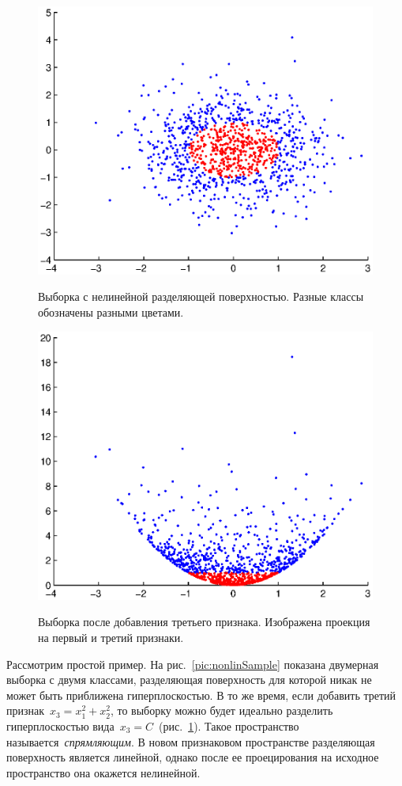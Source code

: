 \documentclass[12pt,fleqn]{article}
\begin{document}
\begin{figure}[t]
\centering
\begin{multicols}{2}
    \hfill
    \includegraphics[width=0.9\linewidth]{pics/example.eps}
    \hfill
    \caption{Выборка с нелинейной разделяющей поверхностью.
        Разные классы обозначены разными цветами.}
    \label{pic:nonlinSample}
    \hfill
    \includegraphics[width=0.9\linewidth]{pics/example_newFeature.eps}
    \hfill
    \caption{Выборка после добавления третьего признака.
        Изображена проекция на первый и третий признаки.}
    \label{pic:nonlinSample_ext}
\end{multicols}
\end{figure}

Рассмотрим простой пример.
На рис.~\ref{pic:nonlinSample} показана двумерная выборка с двумя классами,
разделяющая поверхность для которой никак не может быть приближена гиперплоскостью.
В то же время, если добавить третий признак~$x_3 = x_1^2 + x_2^2$,
то выборку можно будет идеально разделить гиперплоскостью
вида~$x_3 = C$~(рис.~\ref{pic:nonlinSample_ext}).
Такое пространство называется~\emph{спрямляющим}.
В новом признаковом пространстве разделяющая поверхность является
линейной, однако после ее проецирования на исходное пространство
она окажется нелинейной.
\end{document}
